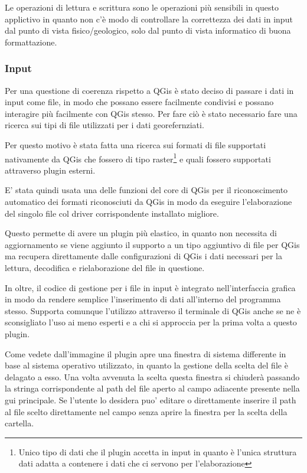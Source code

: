 Le operazioni di lettura e scrittura sono le operazioni più sensibili in questo applictivo in quanto non c'è modo di controllare la correttezza dei dati in input dal punto di vista fisico/geologico, solo dal punto di vista informatico di buona formattazione.

\subsubsection{Input}
Per una questione di coerenza rispetto a QGis è stato deciso di passare i dati in input come file, in modo che possano essere facilmente condivisi e possano interagire più facilmente con QGis stesso. Per fare ciò è stato necessario fare una ricerca sui tipi di file utilizzati per i dati georefernziati.

Per questo motivo è stata fatta una ricerca sui formati di file supportati nativamente da QGis che fossero di tipo raster\footnote{Unico tipo di dati che il plugin accetta in input in quanto è l'unica struttura dati adatta a contenere i dati che ci servono per l'elaborazione} e quali fossero supportati attraverso plugin esterni.

E' stata quindi usata una delle funzioni del core di QGis per il riconoscimento automatico dei formati riconosciuti da QGis in modo da eseguire l'elaborazione del singolo file col driver corrispondente installato migliore.

Questo permette di avere un plugin più elastico, in quanto non necessita di aggiornamento se viene aggiunto il supporto a un tipo aggiuntivo di file per QGis ma recupera direttamente dalle configurazioni di QGis i dati necessari per la lettura, decodifica e rielaborazione del file in questione.

In oltre, il codice di gestione per i file in input è integrato nell'interfaccia grafica in modo da rendere semplice l'inserimento di dati all'interno del programma stesso. Supporta comunque l'utilizzo attraverso il terminale di QGis anche se ne è sconsigliato l'uso ai meno esperti e a chi si approccia per la prima volta a questo plugin.

Come vedete dall'immagine il plugin apre una finestra di sistema differente in base al sistema operativo utilizzato, in quanto la gestione della scelta del file è delagato a esso. Una volta avvenuta la scelta questa finestra si chiuderà passando la stringa corrispondente al path del file aperto al campo adiacente presente nella gui principale. %
Se l'utente lo desidera puo' editare o direttamente inserire il path al file scelto direttamente nel campo senza aprire la finestra per la scelta della cartella.

